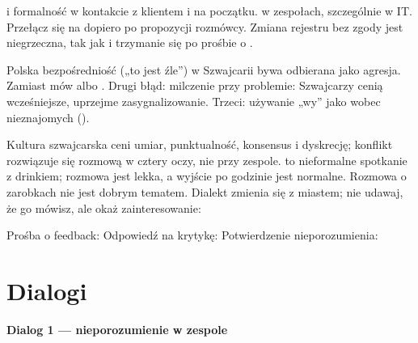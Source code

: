 \begin{zasada}[Rejestr]
 i formalność w kontakcie z klientem i na początku.  w zespołach, szczególnie w IT. Przełącz się na  dopiero po propozycji
rozmówcy. Zmiana rejestru bez zgody jest niegrzeczna, tak jak i trzymanie się  po prośbie o .
\end{zasada}

\begin{falle}
Polska bezpośredniość („to jest źle”) w Szwajcarii bywa odbierana jako agresja. Zamiast  mów 
albo . Drugi błąd: milczenie przy problemie: Szwajcarzy cenią wcześniejsze, uprzejme zasygnalizowanie.
Trzeci: używanie „wy” jako  wobec nieznajomych ().
\end{falle}

\begin{szwajcaria}
Kultura szwajcarska ceni umiar, punktualność, konsensus i dyskrecję; konflikt rozwiązuje się rozmową w cztery oczy, nie przy zespole.
 to nieformalne spotkanie z drinkiem; rozmowa jest lekka, a wyjście po godzinie jest normalne. Rozmowa o zarobkach nie jest dobrym tematem.
Dialekt zmienia się z miastem; nie udawaj, że go mówisz, ale okaż zainteresowanie: 
\end{szwajcaria}

\begin{praca}
Prośba o feedback:  Odpowiedź na krytykę:  Potwierdzenie nieporozumienia: 
\end{praca}

\section{Dialogi}
\textbf{Dialog 1 --- nieporozumienie w zespole}
\begin{dialog}
\end{dialog}

